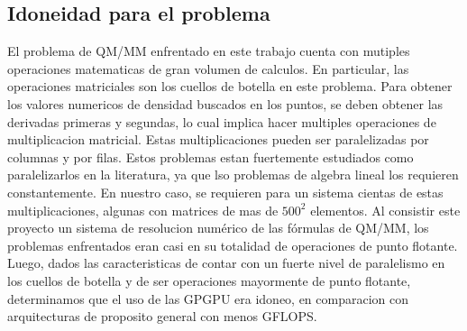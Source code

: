 \subsection{Idoneidad para el problema}
El problema de QM/MM enfrentado en este trabajo cuenta con mutiples operaciones matematicas de gran
volumen de calculos. En particular, las operaciones matriciales son los cuellos de botella en este
problema. 
Para obtener los valores numericos de densidad buscados en los puntos, se deben obtener las derivadas primeras
y segundas, lo cual implica hacer multiples operaciones de multiplicacion matricial. Estas multiplicaciones
pueden ser paralelizadas por columnas y por filas. Estos problemas estan fuertemente estudiados como paralelizarlos
en la literatura, ya que lso problemas de algebra lineal los requieren constantemente. 
En nuestro caso, se requieren para un sistema cientas de estas multiplicaciones, algunas con matrices de mas de
$500^2$ elementos. Al consistir este proyecto un sistema de resolucion num\'erico de las f\'ormulas de QM/MM,
los problemas enfrentados eran casi en su totalidad de operaciones de punto flotante. Luego, dados las
caracteristicas de contar con un fuerte nivel de paralelismo en los cuellos de botella y de ser operaciones
mayormente de punto flotante, determinamos que el uso de las GPGPU era idoneo, en comparacion con arquitecturas
de proposito general con menos GFLOPS.
